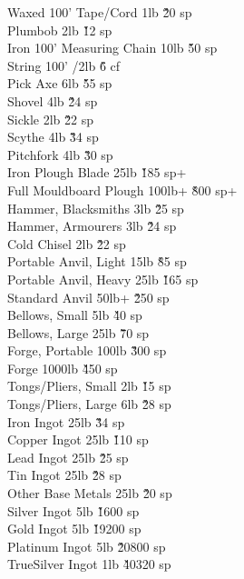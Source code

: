 \begin{multicols}{3}
{\begin{tabbing}
Waxed 100' Tape/Cord			\> 1lb			\' \` 20 sp \\
Plumbob					\> 2lb			\' \` 12 sp \\
Iron 100' Measuring Chain		\> 10lb			\' \` 50 sp \\
String 100'				/2lb			\' \` 6 cf \\
Pick Axe				\> 6lb			\' \` 55 sp \\
Shovel					\> 4lb			\' \` 24 sp \\
Sickle					\> 2lb			\' \` 22 sp \\
Scythe					\> 4lb			\' \` 34 sp \\
Pitchfork				\> 4lb			\' \` 30 sp \\
Iron Plough Blade			\> 25lb			\' \` 185 sp+ \\
Full Mouldboard Plough			\> 100lb+		\' \` 800 sp+ \\
Hammer, Blacksmiths			\> 3lb			\' \` 25 sp \\
Hammer, Armourers			\> 3lb			\' \` 24 sp \\
Cold Chisel				\> 2lb			\' \` 22 sp \\
Portable Anvil, Light			\> 15lb			\' \` 85 sp \\
Portable Anvil, Heavy			\> 25lb			\' \` 165 sp \\
Standard Anvil				\> 50lb+			\' \` 250 sp \\
Bellows, Small				\> 5lb			\' \` 40 sp \\
Bellows, Large				\> 25lb			\' \` 70 sp \\
Forge, Portable				\> 100lb			\' \` 300 sp \\
Forge					\> 1000lb			\' \` 450 sp \\
Tongs/Pliers, Small			\> 2lb			\' \` 15 sp \\
Tongs/Pliers, Large			\> 6lb			\' \` 28 sp \\
Iron Ingot				\> 25lb			\' \` 34 sp \\
Copper Ingot				\> 25lb			\' \` 110 sp \\
Lead Ingot				\> 25lb			\' \` 25 sp \\
Tin Ingot				\> 25lb			\' \` 28 sp \\
Other Base Metals			\> 25lb			\' \` 20 sp \\
Silver Ingot				\> 5lb			\' \` 1600 sp \\
Gold Ingot				\> 5lb			\' \` 19200 sp \\
Platinum Ingot				\> 5lb			\' \` 20800 sp \\
TrueSilver Ingot			\> 1lb			\' \` 40320 sp \\

\end{tabbing}}
\end{multicols}
